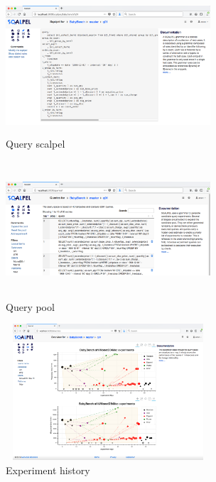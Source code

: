 \documentclass{cidr-2019}
\begin{document}
\begin{figure}[t!]
\centering
\includegraphics[height=2in,width=3in]{Figures/scalpel2.png}
\caption{Query scalpel
	\label{fig:scalpel}}
\end{figure}



\begin{figure}[t!]
\centering
\includegraphics[height=2in,width=3in]{Figures/querypool2.png}
\caption{Query pool
	\label{fig:querypool2}}
\end{figure}

\begin{figure}[t!]
\centering
\includegraphics[height=2in,width=3in]{Figures/history2.png}
\caption{Experiment history
	\label{fig:history}}
\end{figure}
\end{document}
